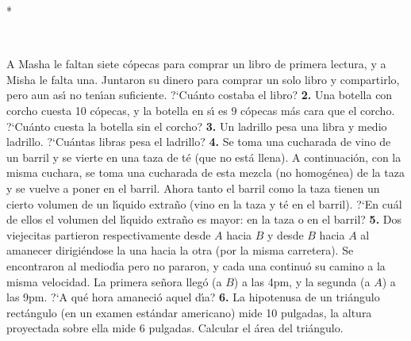 \documentclass[12pt, spanish]{article}  %
\begin{document}
\vspace{0pt plus 12pt}
\centerline{*\quad *\quad*}
\vspace{.4\baselineskip}

\

{} A Masha le faltan siete c\'opecas para comprar un libro de primera lectura, y a Misha le falta una.
Juntaron su dinero para comprar un solo libro y compartirlo, pero aun as\'{\i} no ten\'{\i}an suficiente.
?`Cu\'anto costaba el libro?
\newline\newline
{\bf 2.} Una botella con corcho cuesta 10 c\'opecas, y la botella en s\'{\i} es 9 c\'opecas m\'as cara 
que el corcho. ?`Cu\'anto cuesta la botella sin el corcho?
\newline\newline{}\quad
{\bf 3.} Un ladrillo pesa una libra y medio ladrillo. ?`Cu\'antas libras pesa el ladrillo?
\newline\newline\quad
{\bf 4.} Se toma una cucharada de vino de un barril y se vierte en una taza de t\'e (que no est\'a llena).
A continuaci\'on, con la misma cuchara, se toma una cucharada de esta mezcla (no homog\'enea) de la taza y se vuelve a 
poner en el barril.
Ahora tanto el barril como la taza tienen un cierto volumen de un l\'{\i}quido extra\~no (vino en la taza y t\'e en el
 barril). ?`En cu\'al de ellos el volumen del l\'{\i}quido extra\~no es mayor: en la taza o en el barril?
\newline\newline\quad
{\bf 5.} Dos viejecitas partieron respectivamente desde $A$ hacia $B$ y desde $B$ hacia $A$ al amanecer dirigi\'endose la
 una hacia la otra (por la misma carretera). Se encontraron al mediod\'{\i}a pero no pararon, y cada una continu\'o su 
 camino a la misma velocidad. La primera se\~nora lleg\'o (a $B$) a las 4pm, y la segunda (a $A$) a las 9pm. ?`A qu\'e
  hora amaneci\'o aquel d\'{\i}a? 
\newline\newline\quad
{\bf 6.} La hipotenusa de un tri\'angulo rect\'angulo (en un examen est\'andar americano) mide 10 pulgadas,
la altura proyectada sobre ella mide 6 pulgadas. Calcular el \'area del tri\'angulo.
\end{document}
